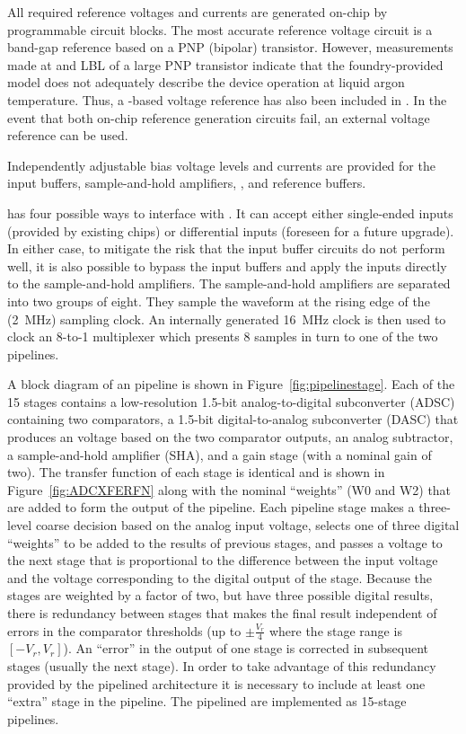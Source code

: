 All required reference voltages and currents are generated on-chip by programmable
circuit blocks.  The most accurate reference voltage circuit is a band-gap reference
based on a PNP (bipolar) transistor.  However, measurements made at  and
LBL of a large PNP transistor indicate that the foundry-provided  model
does not adequately describe the device operation at liquid argon temperature.  Thus,
a -based voltage reference has also been included in .
In the event that both on-chip reference generation circuits fail, an external voltage
reference can be used.

Independently adjustable bias voltage levels and currents are provided for the
input buffers, sample-and-hold amplifiers, , and 
reference buffers.

 has four possible ways to interface with .  It
can accept either single-ended inputs (provided by existing 
chips) or differential inputs (foreseen for a future  upgrade).
In either case, to mitigate the risk that the input buffer circuits do not perform
well, it is also possible to bypass the input buffers and apply the inputs directly
to the sample-and-hold amplifiers.  The sample-and-hold amplifiers are separated
into two groups of eight.  They sample the waveform at the rising edge of the
(\SI{2}{MHz}) sampling clock.  An internally generated \SI{16}{MHz} clock is then
used to clock an 8-to-1 multiplexer which presents 8 samples in turn to one of the
two  pipelines.

A block diagram of an  pipeline is shown in
Figure~\ref{fig:pipelinestage}. Each of the 15 stages contains a low-resolution
1.5-bit analog-to-digital subconverter (ADSC) containing two comparators, a
1.5-bit digital-to-analog subconverter (DASC) that produces an voltage based on
the two comparator outputs, an analog subtractor, a sample-and-hold amplifier
(SHA), and a gain stage (with a nominal gain of two). The transfer function of
each stage is identical and is shown in Figure~\ref{fig:ADCXFERFN} along with
the nominal ``weights'' (W0 and W2) that are added to form the output of the
pipeline. Each pipeline stage makes a three-level coarse decision based on the
analog input voltage, selects one of three digital ``weights'' to be added to the
results of previous stages, and passes a voltage to the next stage that is
proportional to the difference between the input voltage and the voltage
corresponding to the digital output of the stage.  Because the stages are
weighted by a factor of two, but have three possible digital results, there is
redundancy between stages that makes the final result independent of errors in
the comparator thresholds (up to $\pm{\frac{V_r}{4}}$ where the stage range is
$[-V_r,V_r]$).  An ``error'' in the output of one stage is corrected in subsequent
stages (usually the next stage).  In order to take advantage of this redundancy
provided by the pipelined architecture it is necessary to include at least one
``extra'' stage in the pipeline.  The  pipelined  are
implemented as 15-stage pipelines.

